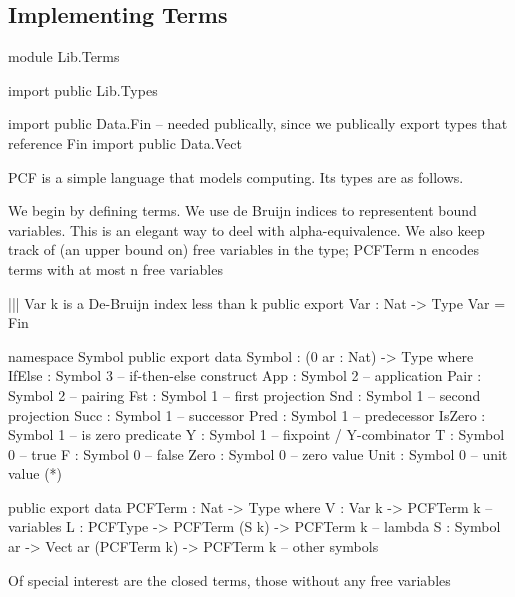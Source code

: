 \subsection{Implementing Terms}

\begin{hidden}
module Lib.Terms

import public Lib.Types

import public Data.Fin  -- needed publically, since we publically export types that reference Fin
import public Data.Vect

\end{hidden}

PCF is a simple language that models computing. Its types are as follows.


We begin by defining terms. We use de Bruijn indices to representent bound
variables. This is an elegant way to deel with alpha-equivalence.
We also keep track of (an upper bound on) free variables in the type;
PCFTerm n encodes terms with at most n free variables

\begin{code}
||| Var k is a De-Bruijn index less than k
public export
Var : Nat -> Type
Var = Fin

namespace Symbol
  public export
  data Symbol : (0 ar : Nat) -> Type where
    IfElse : Symbol 3       -- if-then-else construct
    App    : Symbol 2       -- application
    Pair   : Symbol 2       -- pairing
    Fst    : Symbol 1       -- first projection
    Snd    : Symbol 1       -- second projection
    Succ   : Symbol 1       -- successor
    Pred   : Symbol 1       -- predecessor
    IsZero : Symbol 1       -- is zero predicate
    Y      : Symbol 1       -- fixpoint / Y-combinator
    T      : Symbol 0       -- true
    F      : Symbol 0       -- false
    Zero   : Symbol 0       -- zero value
    Unit   : Symbol 0       -- unit value (*)
\end{code}

\begin{code}
public export
data PCFTerm : Nat -> Type where
  V    : Var k -> PCFTerm k                             -- variables
  L    : PCFType   -> PCFTerm (S k) -> PCFTerm k        -- lambda
  S    : Symbol ar -> Vect ar (PCFTerm k) -> PCFTerm k  -- other symbols
\end{code}

Of special interest are the closed terms, those without any free variables

